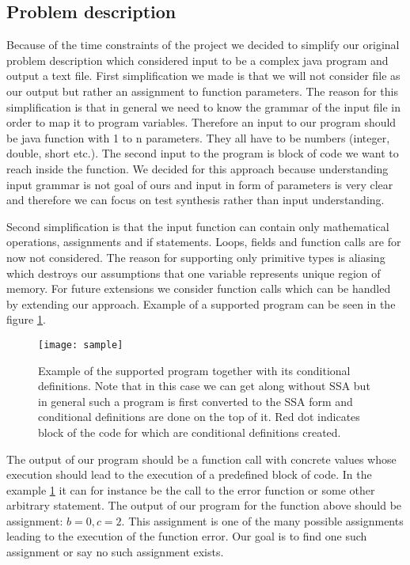 \documentclass[letterpaper,12pt]{article}
\begin{document}
\subsection{Problem description}
Because of the time constraints of the project we decided to simplify our original problem description which considered input to be a complex java program and output a text file. First simplification we made is that we will not consider file as our output but rather an assignment to function parameters. The reason for this simplification is that in general we need to know the grammar of the input file in order to map it to program variables. Therefore an input to our program should be java function with 1 to n parameters. They all have to be numbers (integer, double, short etc.). The second input to the program is block of code we want to reach inside the function. We decided for this approach because understanding input grammar is not goal of ours and input in form of parameters is very clear and therefore we can focus on test synthesis rather than input understanding.

Second simplification is that the input function can contain only mathematical operations, assignments and if statements. Loops, fields and function calls are for now not considered. The reason for supporting only primitive types is aliasing which destroys our assumptions that one variable represents unique region of memory. For future extensions we consider function calls which can be handled by extending our approach. Example of a supported program can be seen in the figure \ref{fig:ecd}.

\begin{figure}[ht] 
    \centering \texttt{[image: sample]}
    \caption{
    \label{fig:ecd}
        Example of the supported program together with its conditional definitions. Note that in this case we can get along without SSA but in general such a program is first converted to the SSA form and conditional definitions are done on the top of it. Red dot indicates block of the code for which are conditional definitions created.
    }
\end{figure}


The output of our program should be a function call with concrete values whose execution should lead to the execution of a predefined block of code. In the example \ref{fig:ecd} it can for instance be the call to the error function or some other arbitrary statement. The output of our program for the function above should be assignment: $b=0,c=2$. This assignment is one of the many possible assignments leading to the execution of the function error. Our goal is to find one such assignment or say no such assignment exists.
\end{document}
